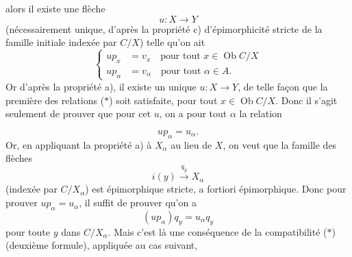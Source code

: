 \documentclass[11pt]{article}
\newcommand{\msp}[1]{\marginpar{\footnotesize [#1]}}
\newcommand{\Ob}{\operatorname{Ob}}
\begin{document}
alors il existe une flèche
\[ u : X \longrightarrow Y \]
(nécessairement unique, d'après la propriété c) d'épimorphicité stricte de la famille initiale indexée par $C/X$) telle qu'on ait
\[ \left\{\begin{aligned}
up_x &= v_x \quad \text{pour tout } x \in \Ob C/X\\ %
up_\alpha &= v_\alpha \quad \text{pour tout } \alpha \in A. %
\end{aligned}\right. \tag*{($*$)} \]
Or d'après la propriété a), il existe un unique $u : X \longrightarrow Y$, de telle façon que la première des relations ($*$) soit satisfaite, pour tout $x \in \Ob C/X$. Donc il s'agit seulement de prouver que pour cet $u$, on a pour tout $\alpha$ la relation

\msp{page 196}
\[ up_\alpha = u_\alpha . \]
Or, en appliquant la propriété a) à $X_\alpha$ au lieu de $X$, on veut que la famille des flèches %
\[ i(y) \xrightarrow{q_y} X_\alpha \]
(indexée par $C/X_\alpha$) est épimorphique stricte, a fortiori épimorphique. Donc pour prouver $up_\alpha = u_\alpha$, il suffit de prouver qu'on a
\[ (up_\alpha)q_y = u_\alpha q_y \tag*{($**$)} \]
pour toute $y$ dans $C/X_\alpha$. Mais c'est là une conséquence de la compatibilité ($*$) (deuxième formule), appliquée au cas suivant,
\end{document}

